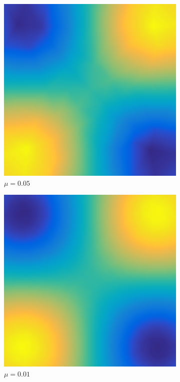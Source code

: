 \documentclass[../fem.tex]{subfile}
\begin{document}
\begin{figure}[htpb]
  \begin{subfigure}{0.4\textwidth}
    \centering
    \includegraphics[width=0.8\linewidth]{figures/r1a/approx.png}
    \caption{$\mu=0.05$}
  \end{subfigure}
  \begin{subfigure}{0.4\textwidth}
    \centering
    \includegraphics[width=0.8\linewidth]{figures/r1b/approx.png}
    \caption{$\mu=0.01$}
  \end{subfigure}
  \begin{subfigure}{0.4\textwidth}
    \centering

\end{subfigure}
\end{figure}
\end{document}
